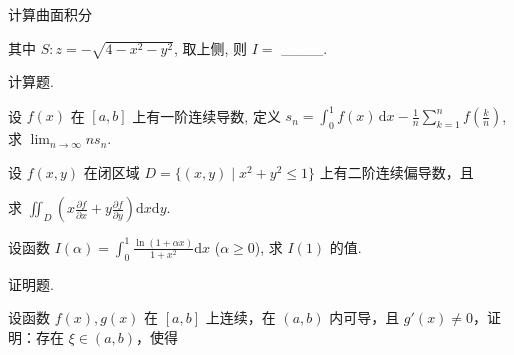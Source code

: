 \par{}
计算曲面积分\par
\nopagebreak[4]
其中 $S: z = -\sqrt{4 - x^2 - y^2}$, 取上侧, 则 $I =$ \_\_\_\_.\par
\par{}
计算题.\par
设 $f(x)$ 在 $[a, b]$ 上有一阶连续导数, 定义 $s_n = \int_0^1 f(x) \, \mathrm{d}x - \frac{1}{n} \sum_{k=1}^{n} f\left(\frac{k}{n}\right)$, 求 $\lim_{n \to \infty} n s_n$.\par
\par{}
设 $f(x, y)$ 在闭区域 $D = \{(x, y) \mid x^2 + y^2 \leq 1\}$ 上有二阶连续偏导数，且\par
\nopagebreak[4]
求 $\iint_{D}\left(x\frac{\partial f}{\partial x} +y\frac{\partial f}{\partial y}\right)\mathrm{d}x\mathrm{d}y.$\par
设函数 $I(\alpha) = \int_0^1\frac{\ln(1 + \alpha x)}{1 + x^2}\mathrm{d}x$ ($\alpha \geq 0$), 求 $I(1)$ 的值.\par
\par{}
证明题.\par
\par{}
设函数 $f(x), g(x)$ 在 $[a, b]$ 上连续，在 $(a, b)$ 内可导，且 $g'(x) \neq 0$，证明：存在 $\xi \in (a, b)$，使得\par
\nopagebreak[4]

